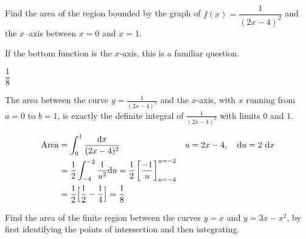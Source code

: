 \subsection*{\Procedural}



\begin{Mquestion}[M105 2013A]
Find the area of the region bounded by the graph of
$f (x) = \dfrac{1}{(2x-4)^2}$ and the $x$--axis
between $x = 0$ and $x = 1$.
\end{Mquestion}

\begin{hint}
If the bottom function is the $x$-axis, this is a familiar question.
\end{hint}

\begin{answer}
$\dfrac{1}{8}$
\end{answer}

\begin{solution}
\begin{center}
\end{center}

The area between the curve $y= \frac{1}{(2x-4)^2}$
and the $x$-axis, with $x$ running from $a=0$ to
$b=1$, is exactly the definite integral of $\frac{1}{(2x-4)^2}$ with limits $0$ and $1$.

\begin{align*}
\mbox{Area}&=\int_0^1 \frac{\mathrm{d}x}{(2x-4)^2}&u=2x-4,\quad\mathrm{d}u=2\ \mathrm{d}x\\
&=\frac{1}{2}\int_{-4}^{-2}\frac{1}{u^2}\mathrm{d}u = \frac{1}{2}\left[\frac{-1}{u}\right]_{u=-4}^{u=-2}\\
&=\frac{1}{2}\Big[\frac{1}{2}-\frac{1}{4}\Big]
=\frac{1}{8}
\end{align*}

\end{solution}

\begin{question}[2016Q2]
Find the area of the finite region between the curves $y=x$ and $y=3x-x^2$, by first identifying the points of intersection and then integrating.
\end{question}

